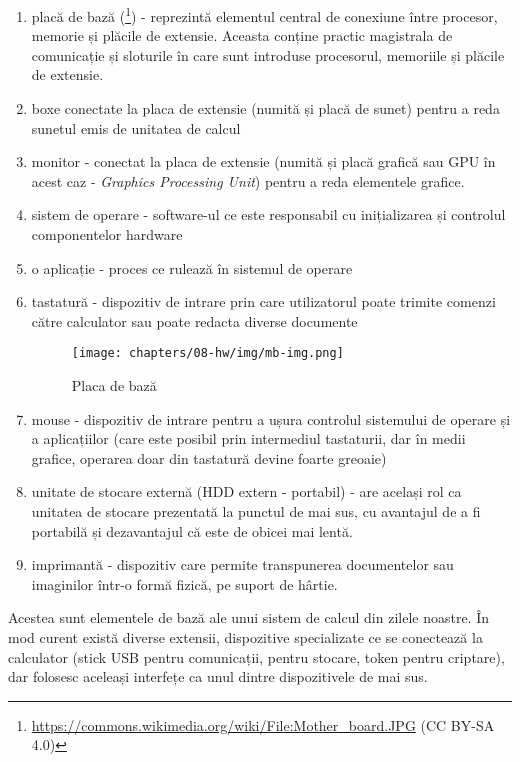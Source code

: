 \begin{enumerate}
  \item placă de bază (\footnote{\url{https://commons.wikimedia.org/wiki/File:Mother_board.JPG} (CC BY-SA 4.0)}) - reprezintă elementul central de conexiune între procesor, memorie și plăcile de extensie.
    Aceasta conține practic magistrala de comunicație și sloturile în care sunt introduse procesorul, memoriile și plăcile de extensie.
  \item boxe conectate la placa de extensie (numită și placă de sunet) pentru a reda sunetul emis de unitatea de calcul
  \item monitor - conectat la placa de extensie (numită și placă grafică sau GPU  în acest caz - \textit{Graphics Processing Unit}) pentru a reda elementele grafice.
  \item sistem de operare - software-ul ce este responsabil cu inițializarea și controlul componentelor hardware
  \item o aplicație - proces ce rulează în sistemul de operare
  \item tastatură - dispozitiv de intrare prin care utilizatorul poate trimite comenzi către calculator sau poate redacta diverse documente

\begin{figure}[!htbp]
  \centering
  \texttt{[image: chapters/08-hw/img/mb-img.png]}
  \caption{Placa de bază}
  \label{fig:hw:mb}
\end{figure}


  \item mouse - dispozitiv de intrare pentru a ușura controlul sistemului de operare și a aplicațiilor (care este posibil prin intermediul tastaturii, dar în medii grafice, operarea doar din tastatură devine foarte greoaie)
  \item unitate de stocare externă (HDD extern - portabil) - are același rol ca unitatea de stocare prezentată la punctul de mai sus, cu avantajul de a fi portabilă și dezavantajul că este de obicei mai lentă.
  \item imprimantă - dispozitiv care permite transpunerea documentelor sau imaginilor într-o formă fizică, pe suport de hârtie.
\end{enumerate}

Acestea sunt elementele de bază ale unui sistem de calcul din zilele noastre.
În mod curent există diverse extensii, dispozitive specializate ce se conectează la calculator (stick USB pentru comunicații, pentru stocare, token pentru criptare), dar folosesc aceleași interfețe ca unul dintre dispozitivele de mai sus.

